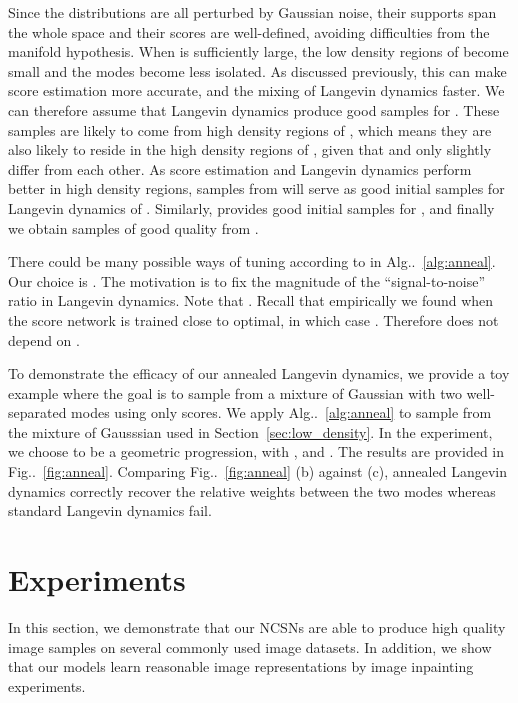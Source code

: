 \documentclass{article}
\makeatletter
\def\@onedot{\ifx\@let@token.\else.\null\fi\xspace}
\DeclareRobustCommand\onedot{\futurelet\@let@token\@onedot}
\newcommand{\figref}[1]{Fig\onedot~\ref{#1}}
\newcommand{\algoref}[1]{Alg\onedot~\ref{#1}}
\newcommand{\secref}[1]{Section~\ref{#1}}
\makeatother
\begin{document}
Since the distributions  are all perturbed by Gaussian noise, their supports span the whole space and their scores are well-defined, avoiding difficulties from the manifold hypothesis. When  is sufficiently large, the low density regions of  become small and the modes become less isolated. As discussed previously, this can make score estimation more accurate, and the mixing of Langevin dynamics faster. We can therefore assume that Langevin dynamics produce good samples for . These samples are likely to come from high density regions of , which means they are also likely to reside in the high density regions of , given that  and  only slightly differ from each other. As score estimation and Langevin dynamics perform better in high density regions, samples from  will serve as good initial samples for Langevin dynamics of . Similarly,  provides good initial samples for , and finally we obtain samples of good quality from .



There could be many possible ways of tuning  according to  in \algoref{alg:anneal}. Our choice is . The motivation is to fix the magnitude of the ``signal-to-noise'' ratio  in Langevin dynamics. Note that . Recall that empirically we found  when the score network is trained close to optimal, in which case . Therefore  does not depend on .

To demonstrate the efficacy of our annealed Langevin dynamics, we provide a toy example where the goal is to sample from a mixture of Gaussian with two well-separated modes using only scores. We apply \algoref{alg:anneal} to sample from the mixture of Gausssian used in \secref{sec:low_density}. In the experiment, we choose  to be a geometric progression, with ,  and . The results are provided in \figref{fig:anneal}. Comparing \figref{fig:anneal} (b) against (c), annealed Langevin dynamics correctly recover the relative weights between the two modes whereas standard Langevin dynamics fail.

 \section{Experiments}
In this section, we demonstrate that our NCSNs are able to produce high quality image samples on several commonly used image datasets. In addition, we show that our models learn reasonable image representations by image inpainting experiments.
\end{document}
